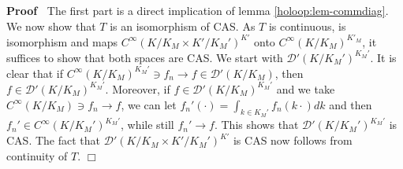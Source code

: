 \documentclass{article}
\newenvironment{proof}{\noindent\textbf{Proof\ }}{\hspace*{\fill}$\Box$\medskip}
\begin{document}
\begin{proof}
  The first part is a direct implication of lemma \ref{holoop:lem-commdiag}.
  We now show that $T$ is an isomorphism of CAS. As $T$ is continuous, is
  isomorphism and maps $C^{\infty} (K / K_M \times K' / K_M')^{K'}$ onto
  $C^{\infty} (K / K_M)^{K'_M}$, it suffices to show that both spaces are CAS.
  We start with $\mathcal{D}' (K / K_M')^{K_M'}$. It is clear that if
  $C^{\infty} (K / K_M)^{K_M'} \ni f_n \rightarrow f \in \mathcal{D}' (K /
  K_M)$, then $f \in \mathcal{D}' (K / K_M)^{K_M'}$. Moreover, if $f \in
  \mathcal{D}' (K / K_M)^{K_M'}$ and we take $C^{\infty} (K / K_M) \ni f_n
  \rightarrow f$, we can let $f_n' (\cdot) = \int_{k \in K_M'} f_n (k \cdot) d
  k$ and then $f_n' \in C^{\infty} (K / K_M')^{K_M'}$, while still $f_n'
  \rightarrow f$. This shows that $\mathcal{D}' (K / K_M')^{K_M'}$ is CAS. The
  fact that $\mathcal{D}' (K / K_M \times K' / K_M')^{K'}$ is CAS now follows
  from continuity of $T$.
\end{proof}
\end{document}
